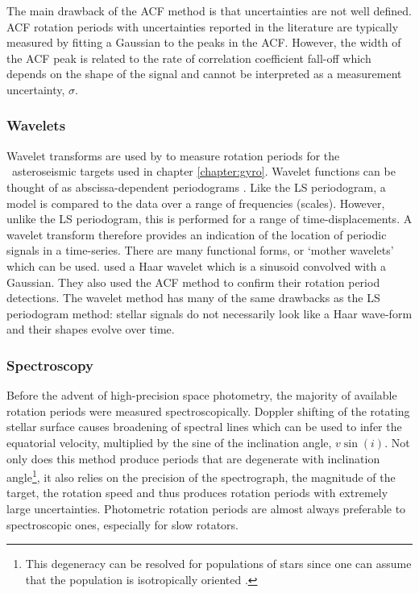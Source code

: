 The main drawback of the ACF method is that uncertainties are not well
defined.
ACF rotation periods with uncertainties reported in the literature are
typically measured by fitting a Gaussian to the peaks in the ACF.
However, the width of the ACF peak is related to the rate of correlation
coefficient fall-off which depends on the shape of the signal and cannot be
interpreted as a measurement uncertainty, $\sigma$.

\subsubsection{Wavelets}
Wavelet transforms are used by \citet{Garcia2014} to measure rotation periods
for the \kepler\ asteroseismic targets used in chapter \ref{chapter:gyro}.
Wavelet functions can be thought of as abscissa-dependent periodograms
\citep{Carter2009}.
Like the LS periodogram, a model is compared to the data over a range of
frequencies (scales).
However, unlike the LS periodogram, this is performed for a range of
time-displacements.
A wavelet transform therefore provides an indication of the location of
periodic signals in a time-series.
There are many functional forms, or `mother wavelets' which can be used.
\citet{Garcia2014} used a Haar wavelet which is a sinusoid convolved with a
Gaussian.
They also used the ACF method to confirm their rotation period detections.
The wavelet method has many of the same drawbacks as the LS periodogram
method: stellar signals do not necessarily look like a Haar wave-form and
their shapes evolve over time.

\subsubsection{Spectroscopy}
Before the advent of high-precision space photometry, the majority of
available rotation periods were measured spectroscopically.
Doppler shifting of the rotating stellar surface causes broadening of spectral
lines which can be used to infer the equatorial velocity, multiplied by the
sine of the inclination angle, $v\sin(i)$.
Not only does this method produce periods that are degenerate with inclination
angle\footnote{This degeneracy can be resolved for populations of stars since
one can assume that the population is isotropically oriented
\citep[\eg][]{Andrews2014}.}, it also relies on the precision of the
spectrograph, the magnitude of the target, the rotation speed and thus
produces rotation periods with extremely large uncertainties.
Photometric rotation periods are almost always preferable to spectroscopic
ones, especially for slow rotators.

